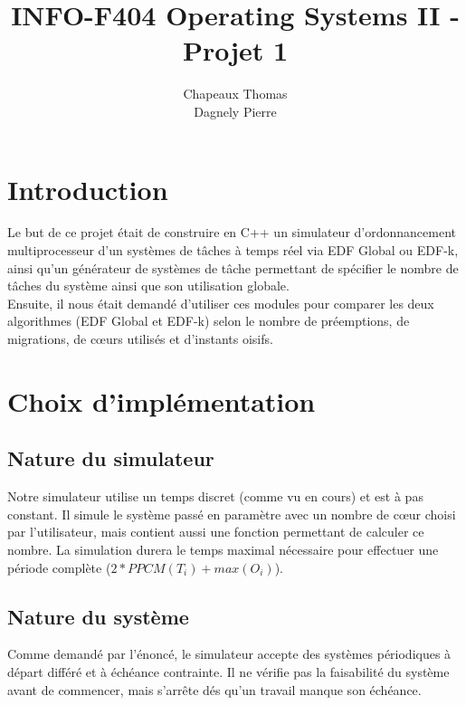 \documentclass[a4paper,10pt]{article}
\title{INFO-F404 Operating Systems II - Projet 1}
\author{Chapeaux Thomas\\Dagnely Pierre}
\begin{document}
\maketitle

\section{Introduction}

	Le but de ce projet était de construire en C++ un simulateur d'ordonnancement multiprocesseur d'un systèmes de tâches à temps réel via EDF Global ou 		EDF-k, ainsi qu'un générateur de systèmes de tâche permettant de spécifier le nombre de tâches du système ainsi que son utilisation globale.\\		

	Ensuite, il nous était demandé d'utiliser ces modules pour comparer les deux algorithmes (EDF Global et EDF-k) selon le nombre de préemptions, de 			migrations, de cœurs utilisés et d'instants oisifs.

\section{Choix d'implémentation}

	\subsection{Nature du simulateur}
		Notre simulateur utilise un temps discret (comme vu en cours) et est à pas constant. Il simule le système passé en paramètre avec un nombre de cœur 		choisi par l'utilisateur, mais contient aussi une fonction permettant de calculer ce nombre. La simulation durera le temps maximal nécessaire pour 			effectuer une période complète ($2*PPCM(T_i) + max(O_i)$).

	\subsection{Nature du système}
		Comme demandé par l'énoncé, le simulateur accepte des systèmes périodiques à départ différé et à échéance contrainte. Il ne vérifie pas la 					faisabilité du système avant de commencer, mais s'arrête dés qu'un travail manque son échéance.\\
\end{document}
